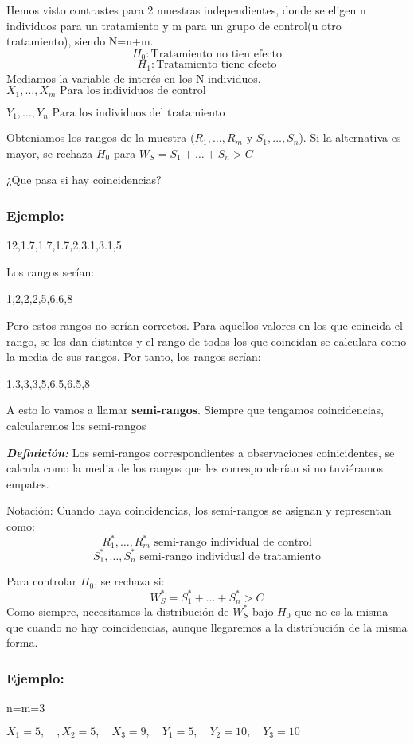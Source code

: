 Hemos visto contrastes para 2 muestras independientes, donde se eligen n individuos para un tratamiento y m para un grupo de control(u otro tratamiento), siendo N=n+m.
\[
H_0: \text{Tratamiento no tien efecto}
\]
\[
H_1: \text{Tratamiento tiene efecto}
\]
Mediamos la variable de interés en los N individuos.
\(
X_1,\dots,X_m \text{ Para los individuos de control}
\)

\(
Y_1,\dots,Y_n \text{ Para los individuos del tratamiento}
\)

Obteniamos los rangos de la muestra ($R_1,\dots,R_m$ y $S_1,\dots,S_n$).
Si la alternativa es mayor, se rechaza $H_0$ para $W_S=S_1+\dots+S_n>C$

¿Que pasa si hay coincidencias?
\subsubsection*{Ejemplo: }
12,1.7,1.7,1.7,2,3.1,3.1,5

Los rangos serían:

1,2,2,2,5,6,6,8

Pero estos rangos no serían correctos. Para aquellos valores en los que coincida el rango, se les dan distintos y el rango de todos los que coincidan se calculara como la media de sus rangos. Por tanto, los rangos serían:

1,3,3,3,5,6.5,6.5,8

A esto lo vamos a llamar \textbf{semi-rangos}. Siempre que tengamos coincidencias, calcularemos los semi-rangos

\textbf{\textit{Definición: }}Los semi-rangos correspondientes a observaciones coinicidentes, se calcula como la media de los rangos que les corresponderían si no tuviéramos empates.

Notación:
 Cuando haya coincidencias, los semi-rangos se asignan y representan como:
 \[
 R_1^*,\dots,R_m^* \text{ semi-rango individual de control}
 \]
 \[
 S_1^*,\dots,S_n^* \text{ semi-rango individual de tratamiento}
 \]

 Para controlar $H_0$, se rechaza si:
 \[
 W_S^*=S_1^*+\dots+S_n^*>C
 \]
Como siempre, necesitamos la distribución de $W_S^*$ bajo $H_0$ que no es la misma que cuando no hay coincidencias, aunque llegaremos a la distribución de la misma forma.
\subsubsection*{Ejemplo:}
n=m=3

\(
X_1=5, \quad, X_2=5, \quad X_3=9, \quad Y_1=5,\quad Y_2=10,\quad Y_3=10
\)

